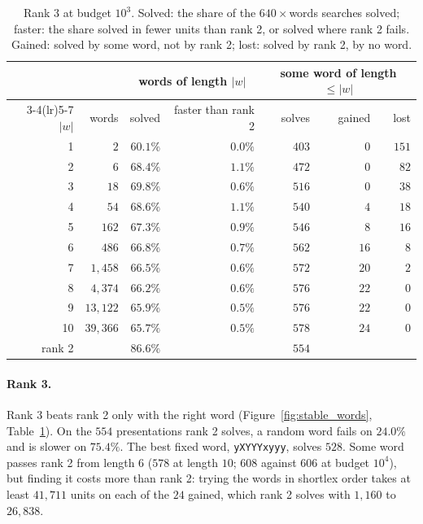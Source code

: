 \begin{table}[ht]
\centering
\small
\begin{tabular}{rrrrrrr}
\toprule
& & \multicolumn{2}{c}{words of length $|w|$} & \multicolumn{3}{c}{some word of length $\le|w|$}\\
\cmidrule(lr){3-4}\cmidrule(lr){5-7}
$|w|$ & words & solved & faster than rank 2 & solves & gained & lost\\
\midrule
1 & $2$ & $60.1\%$ & $0.0\%$ & $403$ & $0$ & $151$\\
2 & $6$ & $68.4\%$ & $1.1\%$ & $472$ & $0$ & $82$\\
3 & $18$ & $69.8\%$ & $0.6\%$ & $516$ & $0$ & $38$\\
4 & $54$ & $68.6\%$ & $1.1\%$ & $540$ & $4$ & $18$\\
5 & $162$ & $67.3\%$ & $0.9\%$ & $546$ & $8$ & $16$\\
6 & $486$ & $66.8\%$ & $0.7\%$ & $562$ & $16$ & $8$\\
7 & $1{,}458$ & $66.5\%$ & $0.6\%$ & $572$ & $20$ & $2$\\
8 & $4{,}374$ & $66.2\%$ & $0.6\%$ & $576$ & $22$ & $0$\\
9 & $13{,}122$ & $65.9\%$ & $0.5\%$ & $576$ & $22$ & $0$\\
10 & $39{,}366$ & $65.7\%$ & $0.5\%$ & $578$ & $24$ & $0$\\
\midrule
rank 2 & & $86.6\%$ & & $554$ & &\\
\bottomrule
\end{tabular}
\caption{Rank 3 at budget $10^3$. Solved: the share of the $640\times$words searches solved; faster: the share solved
in fewer units than rank 2, or solved where rank 2 fails. Gained: solved by some word, not by rank 2; lost: solved by
rank 2, by no word.}
\label{tab:stable_words}
\end{table}

\paragraph{Rank 3.} Rank 3 beats rank 2 only with the right word (Figure~\ref{fig:stable_words},
Table~\ref{tab:stable_words}). On the $554$ presentations rank 2 solves, a random word fails on $24.0\%$ and is
slower on $75.4\%$. The best fixed word, \texttt{yXYYYxyyy}, solves $528$. Some word passes rank 2 from length $6$
($578$ at length $10$; $608$ against $606$ at budget $10^4$), but finding it costs more than rank 2: trying the words
in shortlex order takes at least $41{,}711$ units on each of the $24$ gained, which rank 2 solves with $1{,}160$ to
$26{,}838$.

